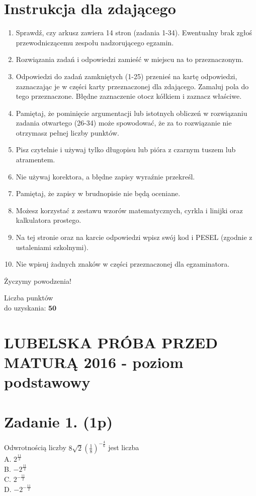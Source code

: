 \documentclass[10pt]{article}
\begin{document}
\section*{Instrukcja dla zdającego}
\begin{enumerate}
  \item Sprawdź, czy arkusz zawiera 14 stron (zadania 1-34). Ewentualny brak zgłoś przewodniczącemu zespołu nadzorującego egzamin.
  \item Rozwiązania zadań i odpowiedzi zamieść w miejscu na to przeznaczonym.
  \item Odpowiedzi do zadań zamkniętych (1-25) przenieś na kartę odpowiedzi, zaznaczając je w części karty przeznaczonej dla zdającego. Zamaluj pola do tego przeznaczone. Błędne zaznaczenie otocz kółkiem i zaznacz właściwe.
  \item Pamiętaj, że pominięcie argumentacji lub istotnych obliczeń w rozwiązaniu zadania otwartego (26-34) może spowodować, że za to rozwiązanie nie otrzymasz pełnej liczby punktów.
  \item Pisz czytelnie i używaj tylko długopisu lub pióra z czarnym tuszem lub atramentem.
  \item Nie używaj korektora, a błędne zapisy wyraźnie przekreśl.
  \item Pamiętaj, że zapisy w brudnopisie nie będą oceniane.
  \item Możesz korzystać z zestawu wzorów matematycznych, cyrkla i linijki oraz kalkulatora prostego.
  \item Na tej stronie oraz na karcie odpowiedzi wpisz swój kod i PESEL (zgodnie z ustaleniami szkolnymi).
  \item Nie wpisuj żadnych znaków w części przeznaczonej dla egzaminatora.
\end{enumerate}

Życzymy powodzenia!

Liczba punktów\\
do uzyskania: \(\mathbf{5 0}\)

\section*{LUBELSKA PRÓBA PRZED MATURĄ 2016 - poziom podstawowy}
\section*{Zadanie 1. (1p)}
Odwrotnością liczby \(8 \sqrt{2}\left(\frac{1}{8}\right)^{-\frac{4}{6}}\) jest liczba\\
A. \(2^{\frac{11}{2}}\)\\
B. \(-2^{\frac{11}{2}}\)\\
C. \(2^{-\frac{11}{2}}\)\\
D. \(-2^{-\frac{11}{2}}\)
\end{document}

